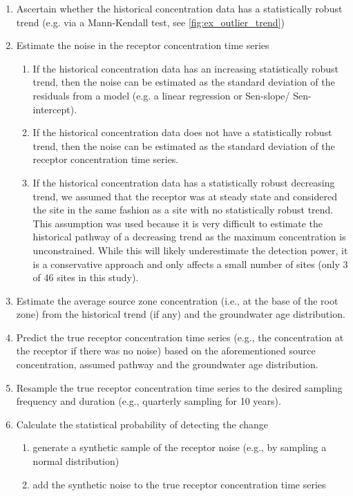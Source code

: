 \begin{enumerate}
    \item Ascertain whether the historical concentration data has a statistically robust trend (e.g. via a Mann-Kendall test, see \autoref{fig:ex_outlier_trend})
    \item Estimate the noise in the receptor concentration time series
    \begin{enumerate}
        \item If the historical concentration data has an increasing statistically robust trend, then the noise can be estimated as the standard deviation of the residuals from a model (e.g. a linear regression or Sen-slope/ Sen-intercept).
        \item If the historical concentration data does not have a statistically robust trend, then the noise can be estimated as the standard deviation of the receptor concentration time series.
        \item If the historical concentration data has a statistically robust decreasing trend, we assumed that the receptor was at steady state and considered the site in the same fashion as a site with no statistically robust trend. This assumption was used because it is very difficult to estimate the historical pathway of a decreasing trend as the maximum concentration is unconstrained. While this will likely underestimate the detection power, it is a conservative approach and only affects a small number of sites (only 3 of 46 sites in this study).
    \end{enumerate}
    \item Estimate the average source zone concentration (i.e., at the base of the root zone) from the historical trend (if any) and the groundwater age distribution.
    \item Predict the true receptor concentration time series (e.g., the concentration at the receptor if there was no noise) based on the aforementioned source concentration, assumed pathway and the groundwater age distribution.
    \item Resample the true receptor concentration time series to the desired sampling frequency and duration (e.g., quarterly sampling for 10 years).
    \item Calculate the statistical probability of detecting the change
    \begin{enumerate}
        \item generate a synthetic sample of the receptor noise (e.g., by sampling a normal distribution)
        \item add the synthetic noise to the true receptor concentration time series

\end{enumerate}
\end{enumerate}
